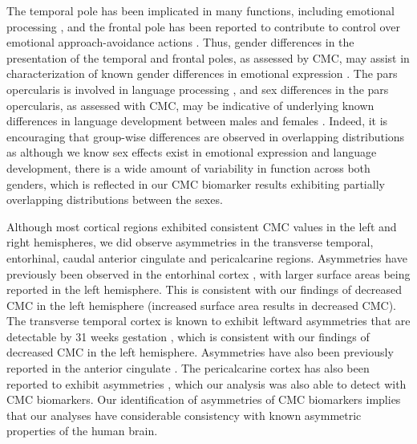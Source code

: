 \documentclass{article}
\begin{document}
The temporal pole has been implicated in many functions, including
emotional processing \citep{corcoles-paradaFrontalInsularInput2019}, and the
frontal pole has been reported to contribute to control over emotional
approach-avoidance actions \citep{bramsonHumanLateralFrontal2020}. Thus,
gender differences in the presentation of the temporal and frontal poles, as
assessed by CMC, may assist in characterization of known gender differences
in emotional expression \citep{chaplinGenderEmotionExpression2015}. The pars
opercularis is involved in language processing
\citep{greweEmergenceUnmarkedNew2005}, and sex differences in the pars
opercularis, as assessed with CMC, may be indicative of underlying known
differences in language development between males and females
\citep{satoNeurobiologySexDifferences2020}. Indeed, it is encouraging that
group-wise differences are observed in overlapping distributions as although
we know sex effects exist in emotional expression and language development,
there is a wide amount of variability in function across both genders, which
is reflected in our CMC biomarker results exhibiting partially overlapping
distributions between the sexes.


%
%
%
%

Although most cortical regions exhibited consistent CMC values in the left
and right hemispheres, we did observe asymmetries in the transverse temporal,
entorhinal, caudal anterior cingulate and pericalcarine regions. Asymmetries
have previously been observed in the entorhinal cortex
\citep{simicHemisphericAsymmetryModular2005}, with larger surface areas being
reported in the left hemisphere. This is consistent with our findings of
decreased CMC in the left hemisphere (increased surface area results in
decreased CMC). The transverse temporal cortex is known to exhibit leftward
asymmetries that are detectable by 31 weeks gestation
\citep{chiLeftRightAsymmetriesTemporal1977}, which is consistent with our
findings of decreased CMC in the left hemisphere. Asymmetries have also been
previously reported in the anterior cingulate
\citep{yanHemisphericAsymmetryCognitive2009}. The pericalcarine cortex has
also been reported to exhibit asymmetries
\citep{chiarelloStructuralAsymmetryHuman2016,koelkebeckContributionCorticalThickness2014},
which our analysis was also able to detect with CMC biomarkers. Our
identification of asymmetries of CMC biomarkers implies that our analyses
have considerable consistency with known asymmetric properties of the human
brain.
\end{document}
